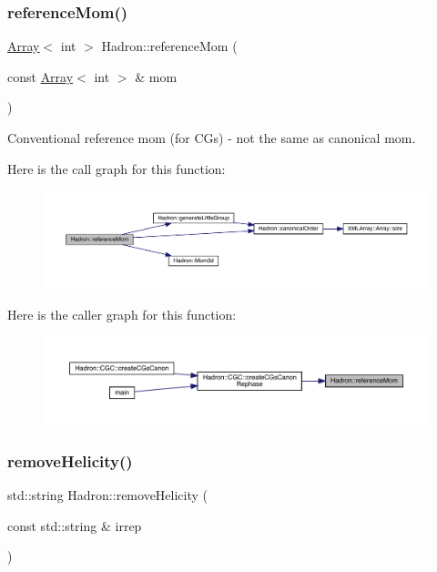 \subsubsection{\texorpdfstring{referenceMom()}{referenceMom()}}
{\footnotesize\ttfamily \mbox{\hyperlink{classXMLArray_1_1Array}{Array}}$<$ int $>$ Hadron\+::reference\+Mom (\begin{DoxyParamCaption}\item[{const \mbox{\hyperlink{classXMLArray_1_1Array}{Array}}$<$ int $>$ \&}]{mom }\end{DoxyParamCaption})}



Conventional reference mom (for C\+Gs) -\/ not the same as canonical mom. 

Here is the call graph for this function\+:\nopagebreak
\begin{figure}[H]
\begin{center}
\leavevmode
\includegraphics[width=350pt]{d1/daf/namespaceHadron_a8a4e39ac150585731d18fb970ec8a1bd_cgraph}
\end{center}
\end{figure}
Here is the caller graph for this function\+:\nopagebreak
\begin{figure}[H]
\begin{center}
\leavevmode
\includegraphics[width=350pt]{d1/daf/namespaceHadron_a8a4e39ac150585731d18fb970ec8a1bd_icgraph}
\end{center}
\end{figure}
\mbox{\label{namespaceHadron_a877ae1e797f5cf4d4ebb7e22d5bbe69b}} 
\subsubsection{\texorpdfstring{removeHelicity()}{removeHelicity()}}
{\footnotesize\ttfamily std\+::string Hadron\+::remove\+Helicity (\begin{DoxyParamCaption}\item[{const std\+::string \&}]{irrep }\end{DoxyParamCaption})}



